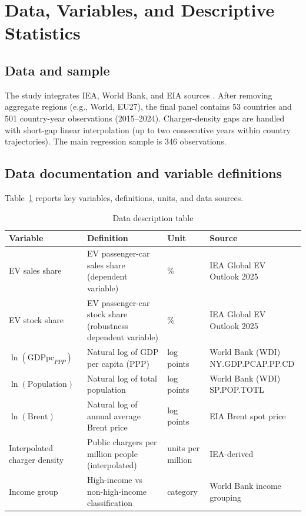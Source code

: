 \documentclass[a4paper,12pt]{article}
\begin{document}
\section{Data, Variables, and Descriptive Statistics}
\subsection{Data and sample}
The study integrates IEA, World Bank, and EIA sources \cite{IEA2025,WorldBankWDI,EIABrent}. After removing aggregate regions (e.g., World, EU27), the final panel contains 53 countries and 501 country-year observations (2015--2024). Charger-density gaps are handled with short-gap linear interpolation (up to two consecutive years within country trajectories). The main regression sample is 346 observations.

\subsection{Data documentation and variable definitions}
Table~\ref{tab:data_dict} reports key variables, definitions, units, and data sources.

\begin{table}[H]
\centering
\caption{Data description table}
\label{tab:data_dict}
\begin{tabular}{>{\raggedright\arraybackslash}p{3.2cm}>{\raggedright\arraybackslash}p{5.8cm}>{\raggedright\arraybackslash}p{2.0cm}>{\raggedright\arraybackslash}p{3.6cm}}
\toprule
Variable & Definition & Unit & Source \\
\midrule
EV sales share & EV passenger-car sales share (dependent variable) & \% & IEA Global EV Outlook 2025 \\
EV stock share & EV passenger-car stock share (robustness dependent variable) & \% & IEA Global EV Outlook 2025 \\
$\ln(\mathrm{GDPpc}_{PPP})$ & Natural log of GDP per capita (PPP) & log points & \shortstack[l]{World Bank (WDI)\\NY.GDP.PCAP.PP.CD} \\
$\ln(\mathrm{Population})$ & Natural log of total population & log points & \shortstack[l]{World Bank (WDI)\\SP.POP.TOTL} \\
$\ln(\text{Brent})$ & Natural log of annual average Brent price & log points & EIA Brent spot price \\
Interpolated charger density & Public chargers per million people (interpolated) & units per million & IEA-derived \\
Income group & High-income vs non-high-income classification & category & World Bank income grouping \\
\bottomrule
\end{tabular}
\end{table}
\end{document}
